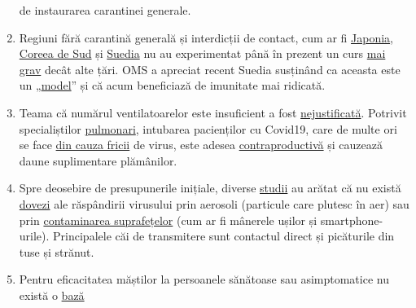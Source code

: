 \begin{enumerate}
  de instaurarea carantinei generale.
\item
  Regiuni fără carantină generală și interdicții de contact, cum ar fi
  \href{https://www.bloomberg.com/news/articles/2020-05-22/did-japan-just-beat-the-virus-without-lockdowns-or-mass-testing}{Japonia},
  \href{https://www.businessinsider.com/south-korea-coronavirus-testing-death-rate-2020-3?op=1}{Coreea
  de Sud} și
  \href{https://www.washingtontimes.com/news/2020/apr/15/sweden-coronavirus-rates-easing-despite-loose-rule/}{Suedia}
  nu au experimentat până în prezent un curs
  \href{https://www.addendum.org/coronavirus/interview-johan-giesecke/}{mai
  grav} decât alte țări. OMS a apreciat recent Suedia susținând ca
  aceasta este un
  „\href{https://www.nau.ch/news/schweiz/coronavirus-who-nennt-schweden-ein-vorbild-65701044}{model}''
  și că acum beneficiază de imunitate mai ridicată.
\item
  Teama că numărul ventilatoarelor este insuficient a fost
  \href{https://off-guardian.org/2020/05/06/covid19-are-ventilators-killing-people/}{nejustificată}.
  Potrivit specialiștilor
  \href{https://www.vpneumo.de/fileadmin/pdf/f2004071.007_Voshaar.pdf}{pulmonari},
  intubarea pacienților cu Covid19, care de multe ori se face
  \href{https://nypost.com/2020/05/29/northwell-health-probing-use-of-ventilators-for-covid-patients/}{din
  cauza fricii} de virus, este adesea
  \href{https://nypost.com/2020/05/29/northwell-health-probing-use-of-ventilators-for-covid-patients/}{contraproductivă}
  și cauzează daune suplimentare plămânilor.
\item
  Spre deosebire de presupunerile inițiale, diverse
  \href{https://www.nordkurier.de/ratgeber/es-gibt-keine-gefahr-jemandem-beim-einkaufen-zu-infizieren-0238940804.html}{studii}
  au arătat că nu există
  \href{https://www.who.int/news-room/commentaries/detail/modes-of-transmission-of-virus-causing-covid-19-implications-for-ipc-precaution-recommendations}{dovezi}
  ale răspândirii virusului prin aerosoli (particule care plutesc în
  aer) sau prin
  \href{https://www.yahoo.com/lifestyle/cdc-coronavirus-mainly-spreads-through-persontoperson-contact-and-does-not-spread-easily-on-contaminated-surfaces-153317029.html}{contaminarea
  suprafețelor} (cum ar fi mânerele ușilor și smartphone-urile).
  Principalele căi de transmitere sunt contactul direct și picăturile
  din tuse și strănut.
\item
  Pentru eficacitatea măștilor la persoanele sănătoase sau asimptomatice
  nu există o
  \href{https://infekt.ch/2020/04/atemschutzmasken-fuer-alle-medienhype-oder-unverzichtbar/}{bază
}
\end{enumerate}
